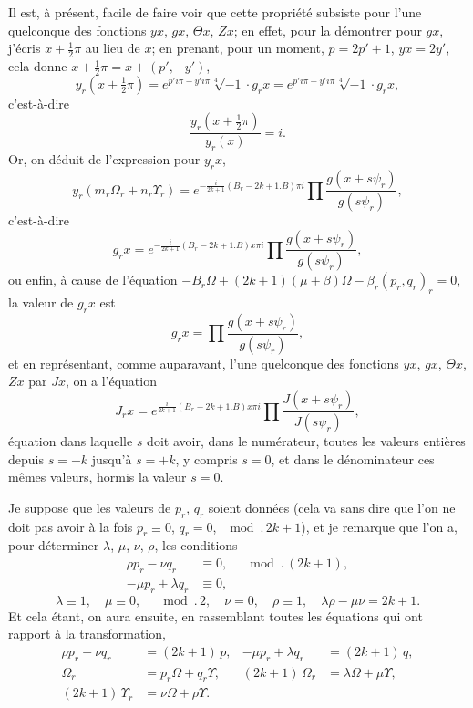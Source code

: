 \documentclass[11pt,a4paper]{book}
\begin{document}
Il est, \`a pr\'esent, facile de faire voir que cette propri\'et\'e subsiste
pour l'une quelconque des fonctions $yx$, $gx$, $\Theta x$, $Zx$; en effet,
pour la d\'emontrer pour $gx$, j'\'ecris $x+\tfrac{1}{2}\pi$ au lieu de $x$;
en prenant, pour un moment, $p = 2p'+1$, $yx = 2y'$, cela donne
$x+\tfrac{1}{2}\pi = x+(p', -y')$,
\[
y_r(x+\tfrac{1}{2}\pi) = e^{p'i\pi - y'i\pi}\sqrt[4]{-1}\cdot g_r x
= e^{p'i\pi - y'i\pi} \sqrt[4]{-1} \cdot g_r x,
\]
c'est-\`a-dire
\[
\frac{y_r(x+\tfrac{1}{2}\pi)}{y_r(x)} = i.
\]
Or, on d\'eduit de l'expression pour $y_r x$,
\[
y_r(m_r\Omega_r + n_r\Upsilon_r) =
e^{-\frac{i}{2k+1}(B_r-2k+1.B)\pi i}
\prod \frac{g(x+s\psi_r)}{g(s\psi_r)},
\]
c'est-\`a-dire
\[
g_r x = e^{-\frac{i}{2k+1}(B_r-2k+1.B)x\pi i}
\prod \frac{g(x+s\psi_r)}{g(s\psi_r)},
\]
ou enfin, \`a cause de l'\'equation
$-B_r\Omega + (2k+1)(\mu+\beta)\Omega - \beta_r(p_r, q_r)_r = 0$,
la valeur de $g_r x$ est
\[
g_r x = \prod \frac{g(x+s\psi_r)}{g(s\psi_r)},
\]
et en repr\'esentant, comme auparavant, l'une quelconque des fonctions
$yx$, $gx$, $\Theta x$, $Zx$ par $Jx$, on a l'\'equation
\[
J_r x = e^{\frac{i}{2k+1}(B_r-2k+1.B)x\pi i}
\prod \frac{J(x+s\psi_r)}{J(s\psi_r)},
\]
\'equation dans laquelle $s$ doit avoir, dans le num\'erateur, toutes les
valeurs enti\`eres depuis $s=-k$ jusqu'\`a $s=+k$, y compris $s=0$, et dans
le d\'enominateur ces m\^emes valeurs, hormis la valeur $s=0$.

Je suppose que les valeurs de $p_r$, $q_r$ soient donn\'ees (cela va sans
dire que l'on ne doit pas avoir \`a la fois $p_r \equiv 0$, $q_r = 0$,
$\mod.\,2k+1$), et je remarque que l'on a, pour d\'eterminer $\lambda$,
$\mu$, $\nu$, $\rho$, les conditions
\begin{align*}
\rho p_r - \nu q_r &\equiv 0, \quad \mod.\,(2k+1), \\
-\mu p_r + \lambda q_r &\equiv 0,
\end{align*}
\[
\lambda \equiv 1,\quad \mu \equiv 0, \quad \mod.\,2,\quad
\nu = 0,\quad \rho \equiv 1,\quad
\lambda\rho - \mu\nu = 2k+1.
\]
Et cela \'etant, on aura ensuite, en rassemblant toutes les \'equations qui
ont rapport \`a la transformation,
\begin{align*}
\rho p_r - \nu q_r &= (2k+1)\,p, &
-\mu p_r + \lambda q_r &= (2k+1)\,q, \\
\Omega_r &= p_r\Omega + q_r\Upsilon, &
(2k+1)\,\Omega_r &= \lambda\Omega + \mu\Upsilon, \\
(2k+1)\,\Upsilon_r &= \nu\Omega + \rho\Upsilon. &
\end{align*}
\end{document}
